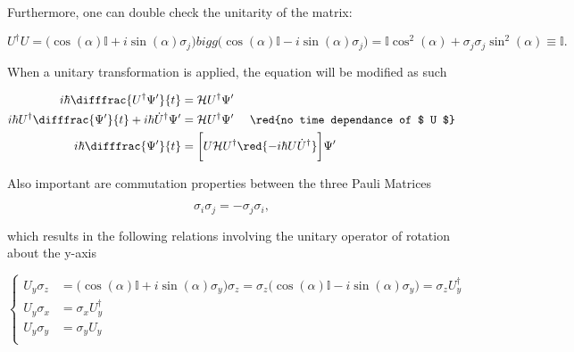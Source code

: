  \noindent Furthermore, one can double check the unitarity of the matrix:
 
 \begin{equation}\label{uniunitary}
 U^{\dagger}U =\bigg( \cos(\alpha)\mathbb{I}+i\sin(\alpha)\sigma_j\bigg)bigg( \cos(\alpha)\mathbb{I}-i\sin(\alpha)\sigma_j\bigg) = \mathbb{I}\cos^2(\alpha)+\sigma_j\sigma_j\sin^2(\alpha)\equiv\mathbb{I}.
 \end{equation}
 
 \noindent When a unitary transformation  is applied, the \schrodinger equation will be modified as such
 
 \begin{equation}\label{uninewschrodinger}
 \begin{aligned}
 i\hbar\difffrac{U^{\dagger}\Psi'}{t} & = \mathcal{H}U^{\dagger}\Psi'\\
 i\hbar{U}^{\dagger}\difffrac{\Psi'}{t} + i\hbar\dot{U}^{\dagger}{\Psi'} & = \mathcal{H}U^{\dagger}\Psi' \quad\text{ \red{no time dependance of $ U $}}\\
 i\hbar\difffrac{\Psi'}{t} & = \bigg[U\mathcal{H}U^{\dagger} \red{-i\hbar U\dot{U}^{\dagger}}\bigg]\Psi'\\
 \end{aligned}
 \end{equation}
 
 
 \noindent Also important are commutation properties between the three Pauli Matrices
 
 \begin{equation}\label{uniComm}
 	\sigma_i\sigma_j=-\sigma_j\sigma_i,
 \end{equation}
 
 \noindent which results in the following relations involving the unitary operator of rotation about the y-axis
 
 \begin{equation}\label{uniComm1}
 	\left\lbrace\begin{aligned}
	 	U_{y}\sigma_z & = \bigg(\cos(\alpha)\mathbb{I}+i\sin(\alpha)\sigma_y\bigg)\sigma_z = \sigma_z\bigg(\cos(\alpha)\mathbb{I}-i\sin(\alpha)\sigma_y\bigg) = \sigma_zU_y^{\dagger}\\
	 	U_{y}\sigma_x & = \sigma_xU_y^{\dagger}\\
	 	U_{y}\sigma_y & = \sigma_yU_y\\
	 	 	\end{aligned}\right.
 \end{equation}
 
